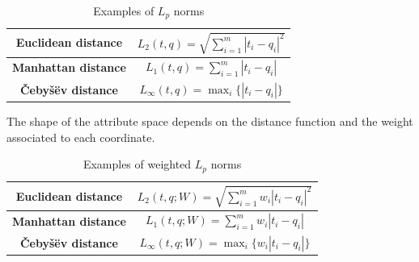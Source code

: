 \renewcommand*{\arraystretch}{2}
\begin{table}[H]
    \centering
    \begin{tabular}{|cc|}
    \hline
    \textbf{Euclidean distance}                     & $L_2(t,q)=\sqrt{\sum_{i=1}^{m}{\left\lvert t_i-q_i \right\rvert^{2}}}$                                                 \\ \hline
    \textbf{Manhattan distance}                     & $L_1(t,q)=\sum_{i=1}^{m}{\left\lvert t_i-q_i \right\rvert}$                                                 \\ \hline
    \textbf{Čebyšëv distance}                       & $L_{\infty}(t,q)=\max_{i}\{\left\lvert t_i-q_i\right\rvert\}$ \\ \hline
    \end{tabular}
    \caption{Examples of $L_p$ norms}
\end{table}
The shape of the attribute space depends on the distance function and the weight associated to each coordinate. 
\begin{table}[H]
    \centering
    \begin{tabular}{|cc|}
    \hline
    \textbf{Euclidean distance}                     & $L_2(t,q;W)=\sqrt{\sum_{i=1}^{m}{w_i\left\lvert t_i-q_i \right\rvert^{2}}}$                                                 \\ \hline
    \textbf{Manhattan distance}                     & $L_1(t,q;W)=\sum_{i=1}^{m}{w_i\left\lvert t_i-q_i \right\rvert}$                                                 \\ \hline
    \textbf{Čebyšëv distance}                       & $L_{\infty}(t,q;W)=\max_{i}\{w_i \left\lvert t_i-q_i\right\rvert\}$ \\ \hline
    \end{tabular}
    \caption{Examples of weighted $L_p$ norms}
\end{table}
\renewcommand*{\arraystretch}{1}

